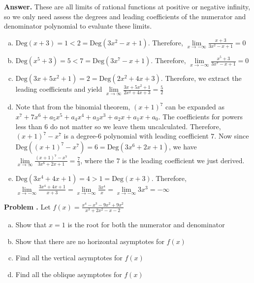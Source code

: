 \documentclass[11pt,letterpaper]{article}
\newcounter{problem}
\newcommand{\problem}{
	\stepcounter{problem}%
	\noindent \textbf{Problem \theproblem. }%
}
\newcommand{\answer}{\noindent \textbf{Answer. }}
\begin{document}
\answer
These are all limits of rational functions at positive or negative infinity, so we only need assess the degrees and leading coefficients of the numerator and denominator polynomial to evaluate these limits.
\begin{enumerate}[(a)]
    \item $\text{Deg}(x+3) = 1 < 2 = \text{Deg}(3x^2-x+1)$. Therefore, $\lim\limits_{x \to -\infty} \frac{x+3}{3x^2-x+1} = 0$
    \item $\text{Deg}(x^5+3) = 5 < 7 = \text{Deg}(3x^7-x+1)$. Therefore, $\lim\limits_{x \to -\infty} \frac{x^5+3}{3x^7-x+1} = 0$
    \item $\text{Deg}(3x + 5x^2 + 1) = 2 = \text{Deg}(2x^2 + 4x + 3)$.  Therefore, we extract the leading coefficients and yield $\lim\limits_{x \to \infty} \frac{3x+5x^2+1}{2x^2+4x+3} = \frac{5}{2}$
    \item Note that from the binomial theorem, $(x+1)^7$ can be expanded as $x^7 + 7x^6 + a_5 x^5 + a_4 x^4 + a_3 x^3 + a_2 x + a_1x + a_0$.  The coefficients for powers less than $6$ do not matter so we leave them uncalculated.  Therefore, $(x+1)^7 - x^7$ is a degree-$6$ polynomial with leading coefficient $7$.  Now since $\text{Deg}((x+1)^7 - x^7) = 6 = \text{Deg}(3x^6+2x+1)$, we have $\lim\limits_{x \to \infty} \frac{(x+1)^7-x^7}{3x^6+2x+1} = \frac{7}{3}$, where the $7$ is the leading coefficient we just derived.
    \item $\text{Deg}(3x^4 + 4x + 1) = 4 > 1 = \text{Deg}(x+3)$. Therefore, $\lim\limits_{x \to -\infty} \frac{3x^4+4x+1}{x+3} = \lim\limits_{x \to -\infty} \frac{3x^4}{x} = \lim\limits_{x \to -\infty} 3x^3 = -\infty$
\end{enumerate}\vspace{6mm}


\problem Let $f(x) = \frac{x^4-x^3-9x^2+9x^2}{x^3+2x^2-x-2}$
\begin{enumerate}[(a)]
    \item Show that $x=1$ is the root for both the numerator and denominator
    \item Show that there are no horizontal asymptotes for $f(x)$
    \item Find all the vertical asymptotes for $f(x)$
    \item Find all the oblique asymptotes for $f(x)$
\end{enumerate}\vspace{6mm}
\end{document}
